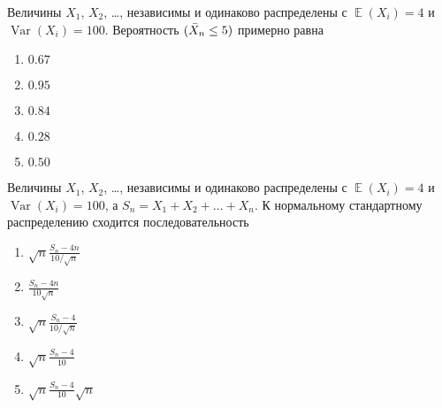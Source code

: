 \documentclass[t]{beamer}
\DeclareMathOperator{\Var}{Var}
\DeclareMathOperator{\E}{\mathbb{E}}
\let\P\relax
\DeclareMathOperator{\P}{\mathbb{P}}
\begin{document}
 \begin{frame} \label{36} 
\begin{block}{36} 

Величины $X_1$, $X_2$, \ldots, независимы и одинаково распределены с $\E(X_i) = 4$ и $\Var(X_i) = 100$. Вероятность $\P(\bar X_n \leq 5)$ примерно равна
  


 \end{block} 
\begin{enumerate} 
\item[] \hyperlink{36-No}{\beamergotobutton{}  $0.67$ }
\item[] \hyperlink{36-No}{\beamergotobutton{}  $0.95$ }
\item[] \hyperlink{36-Yes}{\beamergotobutton{}  $0.84$ }
\item[] \hyperlink{36-No}{\beamergotobutton{}  $0.28$ }
\item[] \hyperlink{36-No}{\beamergotobutton{}  $0.50$ }
\end{enumerate} 
\end{frame} 


 \begin{frame} \label{37} 
\begin{block}{37} 

Величины $X_1$, $X_2$, \ldots, независимы и одинаково распределены с $\E(X_i) = 4$ и $\Var(X_i) = 100$, а $S_n = X_1 + X_2 + \ldots + X_n$. К нормальному стандартному распределению сходится последовательность
  


 \end{block} 
\begin{enumerate} 
\item[] \hyperlink{37-No}{\beamergotobutton{}  $\sqrt{n}\frac{S_n - 4n}{10/\sqrt{n}}$}
\item[] \hyperlink{37-Yes}{\beamergotobutton{}  $\frac{S_n - 4n}{10\sqrt{n}}$}
\item[] \hyperlink{37-No}{\beamergotobutton{}  $\sqrt{n}\frac{S_n - 4}{10/\sqrt{n}}$}
\item[] \hyperlink{37-No}{\beamergotobutton{}  $\sqrt{n}\frac{S_n - 4}{10}$}
\item[] \hyperlink{37-No}{\beamergotobutton{}  $\sqrt{n}\frac{S_n - 4}{10}\sqrt{n}$}
\end{enumerate} 
\end{frame} 
\end{document}
